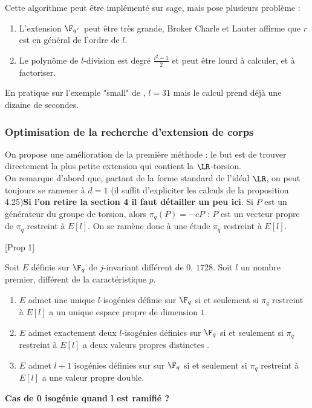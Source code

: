 Cette algorithme peut être implémenté sur sage, mais pose plusieurs problème :

\begin{enumerate}
	\item L'extension $\F_{q^r}$ peut être très grande, Broker Charle et Lauter affirme que $r$ est en général de l'ordre de $l$. 
	\item Le polynôme de $l$-division est degré $\frac{l^2 - 1}{2}$ et peut être lourd à calculer, et à factoriser.
\end{enumerate}

En pratique sur l'exemple "small" de \cite{BrokerCharlesLauter}, $l = 31$ mais le calcul prend déjà une dizaine de secondes.







\subsubsection{Optimisation de la recherche d'extension de corps}

On propose une amélioration de la première méthode : le but est de trouver directement la plus petite extension qui contient la $\LR$-torsion.\\

On remarque d'abord que, partant de la forme standard de l'idéal $\LR$, on peut toujours se ramener à $d = 1$ (il suffit d'expliciter les calculs de la proposition 4.25)\textbf{Si l'on retire la section 4 il faut détailler un peu ici}. Si $P$ est un générateur du groupe de torsion, alors $\pi_{q}(P) = -cP$ : $P$ est un vecteur propre de $\pi_{q}$ restreint à $E[l]$. On se ramène donc à une étude $\pi_{q}$ restreint à $E[l]$.

\begin{Prop}\cite{MMSTV}[Prop 1]
	
	Soit $E$ définie sur $\F_{q}$ de $j$-invariant différent de $0$, $1728$. Soit $l$ un nombre premier, différent de la caractéristique $p$. 
	\begin{enumerate}
		\item $E$ admet une unique $l$-isogénies définie sur $\F_{q}$ si et seulement si $\pi_{q}$ restreint à $E[l]$ a un unique espace propre de dimension $1$.
		\item $E$ admet exactement deux $l$-isogénies définies sur $\F_{q}$ si et seulement si $\pi_{q}$ restreint à $E[l]$ a deux valeurs propres distinctes .
		\item $E$ admet $l+1$ isogénies définies sur sur $\F_{q}$ si et seulement si $\pi_{q}$ restreint à $E[l]$ a une valeur propre double.
	\end{enumerate}
	
\textbf{ Cas de 0 isogénie quand l est ramifié ?}

\end{Prop}

